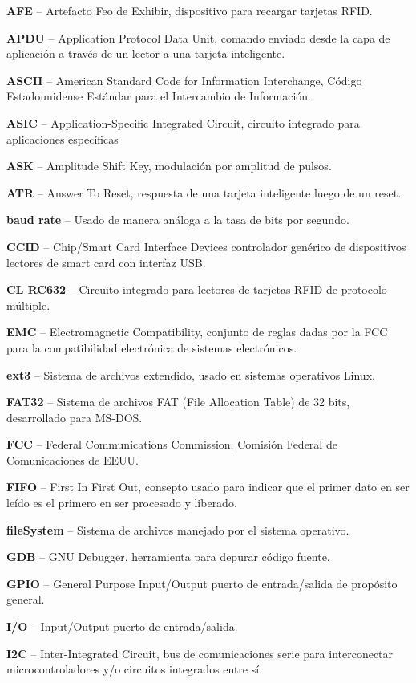 \begin{glosario}

{\bf{AFE}} – Artefacto Feo de Exhibir, dispositivo para recargar tarjetas RFID.

{\bf{APDU}} – Application Protocol Data Unit, comando enviado desde la capa de aplicación a través de un lector a una tarjeta inteligente.

{\bf{ASCII}} – American Standard Code for Information Interchange, Código Estadounidense Estándar para el Intercambio de Información.

{\bf{ASIC}} – Application-Specific Integrated Circuit, circuito integrado para aplicaciones específicas

{\bf{ASK}} – Amplitude Shift Key, modulación por amplitud de pulsos.

{\bf{ATR}} – Answer To Reset, respuesta de una tarjeta inteligente luego de un reset.

{\bf{baud rate}} – Usado de manera análoga a la tasa de bits por segundo.

{\bf{CCID}} – Chip/Smart Card Interface Devices controlador genérico de dispositivos lectores de smart card con interfaz USB.

{\bf{CL RC632}} – Circuito integrado para lectores de tarjetas RFID de protocolo múltiple.

{\bf{EMC}} – Electromagnetic Compatibility, conjunto de reglas dadas por la FCC para la compatibilidad electrónica de sistemas electrónicos.

{\bf{ext3}} – Sistema de archivos extendido, usado en sistemas operativos Linux.

{\bf{FAT32}} – Sistema de archivos FAT (File Allocation Table) de 32 bits, desarrollado para MS-DOS.

{\bf{FCC}} – Federal Communications Commission, Comisión Federal de Comunicaciones de EEUU.

{\bf{FIFO}}  – First In First Out, consepto usado para indicar que el primer dato en ser leído es el primero en ser procesado y liberado.

{\bf{fileSystem}} – Sistema de archivos manejado por el sistema operativo.

{\bf{GDB}} – GNU Debugger,  herramienta para depurar código fuente.

{\bf{GPIO}} – General Purpose Input/Output  puerto de entrada/salida de propósito general.

{\bf{I/O}} – Input/Output puerto de entrada/salida.

{\bf{I2C}} – Inter-Integrated Circuit, bus de comunicaciones serie para interconectar microcontroladores y/o circuitos integrados entre sí.


\end{glosario}
